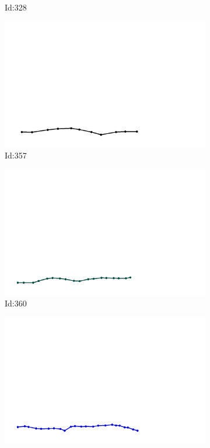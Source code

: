 \documentclass[12pt,twoside]{report}
\begin{document}
\begin{figure}
\begin{subfigure}[b]{0.20\textwidth}
\caption{Id:328}
\end{subfigure}
\begin{subfigure}[b]{0.20\textwidth}
\centering
\includegraphics[width=\textwidth]{../../trajectories/357.png}
\caption{Id:357}
\end{subfigure}
\begin{subfigure}[b]{0.20\textwidth}
\centering
\includegraphics[width=\textwidth]{../../trajectories/360.png}
\caption{Id:360}
\end{subfigure}
\begin{subfigure}[b]{0.20\textwidth}
\centering
\includegraphics[width=\textwidth]{../../trajectories/361.png}

\end{subfigure}
\end{figure}
\end{document}
